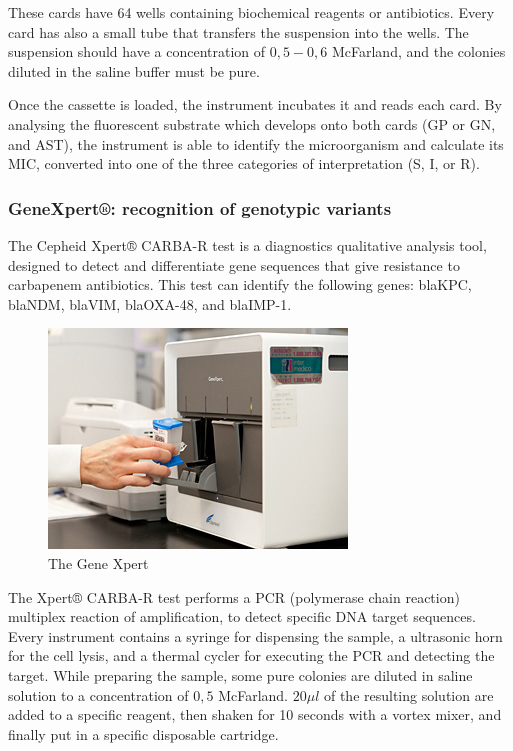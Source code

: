\documentclass[11pt]{report}
\begin{document}
These cards have 64 wells containing biochemical reagents or antibiotics. Every card has also a small tube that transfers the suspension into the wells.
The suspension should have a concentration of $0,5-0,6$ McFarland, and the colonies diluted in the saline buffer must be pure.

Once the cassette is loaded, the instrument incubates it and reads each card.
By analysing the fluorescent substrate which develops onto both cards (GP or GN, and AST), the instrument is able to identify the microorganism and calculate its MIC, converted into one of the three categories of interpretation (S, I, or R).

\subsubsection{GeneXpert®: recognition of genotypic variants}
The Cepheid Xpert® CARBA-R test is a diagnostics qualitative analysis tool, designed to detect and differentiate gene sequences that give resistance to carbapenem antibiotics.
This test can identify the following genes: blaKPC, blaNDM, blaVIM, blaOXA-48, and blaIMP-1.

\begin{figure}[htp]
\centering
\includegraphics[scale=1.00]{immagini gamalero/genexpert.jpg}
\caption{The Gene Xpert}
\label{}
\end{figure}

The Xpert® CARBA-R test performs a PCR (polymerase chain reaction) multiplex reaction of amplification, to detect specific DNA target sequences.
Every instrument contains a syringe for dispensing the sample, a ultrasonic horn for the cell lysis, and a thermal cycler for executing the PCR and detecting the target.
While preparing the sample, some pure colonies are diluted in saline solution to a concentration of $0,5$ McFarland. 
$20\mu l$ of the resulting solution are added to a specific reagent, then shaken for 10 seconds with a vortex mixer, and finally put in a specific disposable cartridge.
\end{document}
